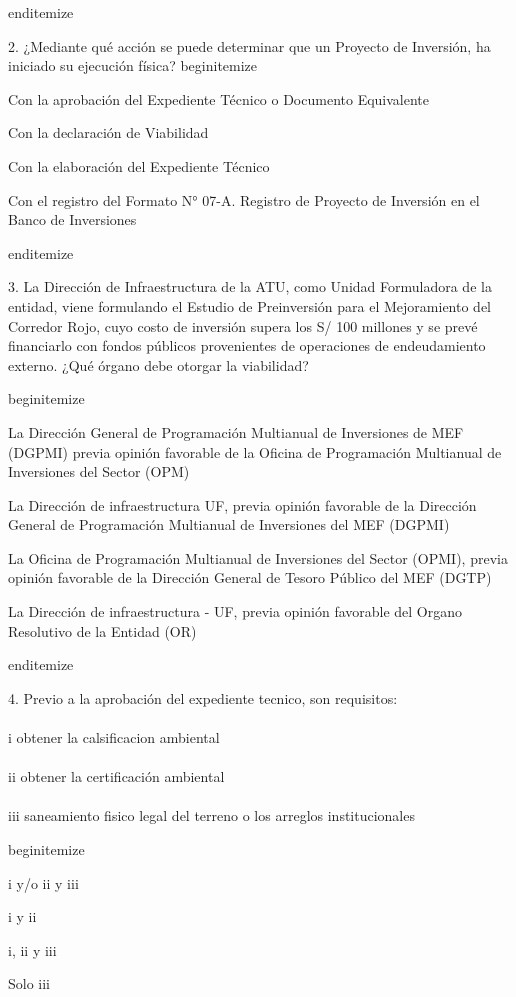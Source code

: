 end{itemize}

2. ¿Mediante qué acción se puede determinar que un Proyecto de Inversión, ha iniciado su ejecución física?
begin{itemize}
			\item Con la aprobación del Expediente Técnico o Documento Equivalente
			\item Con la declaración de Viabilidad
			\item Con la elaboración del Expediente Técnico
			\item Con el registro del Formato N° 07-A. Registro de Proyecto de Inversión en el Banco de Inversiones

end{itemize}

3. La Dirección de Infraestructura de la ATU, como Unidad Formuladora de la entidad, viene formulando el Estudio de Preinversión para el Mejoramiento del Corredor Rojo, cuyo costo de inversión supera los S/ 100 millones y se prevé financiarlo con fondos públicos provenientes de operaciones de endeudamiento externo. ¿Qué órgano debe otorgar la viabilidad?

begin{itemize}
			\item La Dirección General de Programación Multianual de Inversiones de MEF (DGPMI) previa opinión favorable de la Oficina de Programación Multianual de Inversiones del Sector (OPM)
			\item La Dirección de infraestructura UF, previa opinión favorable de la Dirección General de Programación Multianual de Inversiones del MEF (DGPMI)
			\item La Oficina de Programación Multianual de Inversiones del Sector (OPMI), previa opinión favorable de la Dirección General de Tesoro Público del MEF (DGTP)  
			\item La Dirección de infraestructura - UF, previa opinión favorable del Organo Resolutivo de la Entidad (OR)

end{itemize}

4. Previo a la aprobación del expediente tecnico, son requisitos:\\
\\
i obtener la calsificacion ambiental\\
\\
ii obtener la certificación ambiental \\
\\
iii saneamiento fisico legal del terreno o los arreglos institucionales 

begin{itemize}
			\item i y/o ii y iii
			\item i y ii
			\item i, ii y iii
			\item Solo iii


